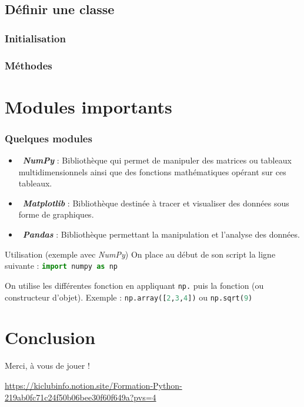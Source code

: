 \documentclass{beamer}
\begin{document}
    \subsection{Définir une classe}
    \begin{frame}
        \frametitle{Initialisation}
        
    \end{frame}
    \begin{frame}
        \frametitle{Méthodes}
        
    \end{frame}

    \section{Modules importants}
    \begin{frame}
        \frametitle{Quelques modules}
        \begin{itemize}
            \item \faCalculator \ \textbf{\textit{NumPy}} : Bibliothèque  qui permet de manipuler des matrices ou tableaux multidimensionnels ainsi que des fonctions mathématiques opérant sur ces tableaux.
            \item \faChartBar \ \textbf{\textit{Matplotlib}} : Bibliothèque destinée à tracer et visualiser des données sous forme de graphiques.
            \item \faTable \ \textbf{\textit{Pandas}} : Bibliothèque permettant la manipulation et l'analyse des données.
        \end{itemize}

        \begin{block}{Utilisation (exemple avec \textit{NumPy})}
            On place au début de son script la ligne suivante :
            \lstinline[language=Python]{import numpy as np} 

            On utilise les différentes fonction en appliquant \lstinline[language=Python]{np.} puis la fonction (ou constructeur d'objet). Exemple : \lstinline[language=Python]{np.array([2,3,4])} ou \lstinline[language=Python]{np.sqrt(9)}

        \end{block}
    \end{frame}

    \section*{Conclusion}
    \begin{frame}
        \centering
        \Huge Merci, à vous de jouer !
        
        \vspace{1cm}

        \normalsize\url{https://kiclubinfo.notion.site/Formation-Python-219ab0fc71c24f50b06bee30f60f649a?pvs=4}

        \vspace{.5cm}
    \end{frame}
\end{document}
